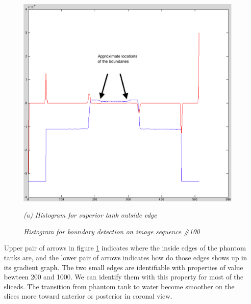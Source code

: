 \begin{figure}[htb]
  \begin{minipage}[t]{5in}
    \centering
    \centerline{\mbox{\includegraphics[width=5in]{data_extraction/images/sample/20121017_100/Coronal/superior_outside/superior_outside_histogram_marked.eps}}}
    \centerline{\emph{(a) Histogram for superior tank outside edge}}
  \end{minipage}
  \caption{\emph{Histogram for boundary detection on image sequence \#100}}
  \label{fig:coronal_270_boundary_histogram}
\end{figure}

Upper pair of arrows in figure \ref{fig:coronal_270_boundary_histogram} indicates where the inside edges of
the phantom tanks are, and the lower pair of arrows indicates how do those edges shows up in its gradient graph.
The two small edges are identifiable with properties of value bewteen 200 and 1000. We can identify them with
this property for most of the sliceds. The transition from phantom tank to water become smoother on the slices
more toward anterior or posterior in coronal view. 

